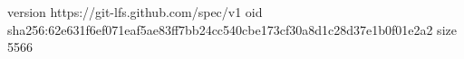 version https://git-lfs.github.com/spec/v1
oid sha256:62e631f6ef071eaf5ae83ff7bb24cc540cbe173cf30a8d1c28d37e1b0f01e2a2
size 5566
